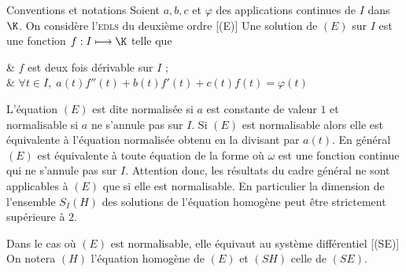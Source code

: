 \begin{genthm}{Conventions et notations}
Soient $a,b,c$ et $\varphi$ des applications continues de $I$ dans $\K$. On considère l'\textsc{edls} du deuxième ordre
[(E)]
Une solution de $(E)$ sur $I$ est une fonction $f:I\longmapsto \K$ telle que
\begin{cond}
& $f$ est deux fois dérivable sur $I$ ;\\
& $\forall t\in I,\; a(t)f''(t)+b(t)f'(t)+c(t)f(t)=\varphi(t)$
\end{cond}

L'équation $(E)$ est dite normalisée si $a$ est constante de valeur $1$ et normalisable si $a$ ne s'annule pas sur $I$.
\nb Si $(E)$ est normalisable alors elle est équivalente à l'équation normalisée obtenu en la divisant par $a(t)$. En général $(E)$ est équivalente à toute équation de la forme
où $\omega$ est une fonction continue qui ne s'annule pas sur $I$.
\endnb
Attention donc, les résultats du cadre général ne sont applicables à $(E)$ que si elle est normalisable. En particulier la dimension de l'ensemble $S_I(H)$ des solutions de l'équation homogène peut être strictement supérieure à $2$.

Dans le cas où $(E)$ est normalisable, elle équivaut au système différentiel
[(SE)]
On notera $(H)$ l'équation homogène de $(E)$ et $(SH)$ celle de $(SE)$.
\end{genthm}


